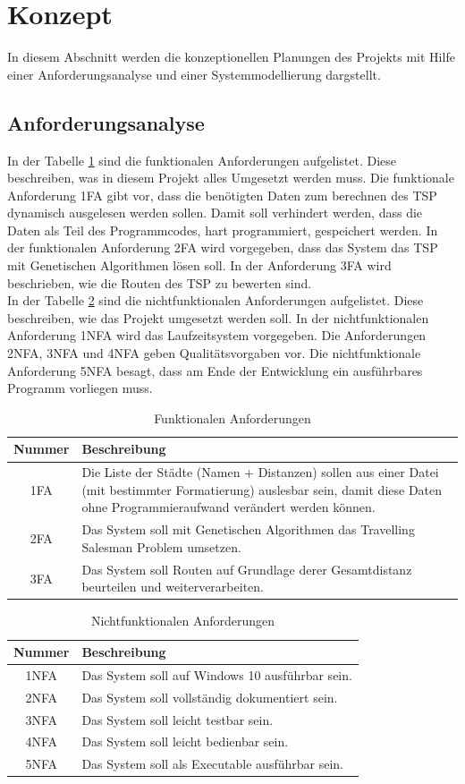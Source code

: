 \section{Konzept}
In diesem Abschnitt werden die konzeptionellen Planungen des Projekts mit Hilfe einer Anforderungsanalyse und einer Systemmodellierung dargstellt.

\subsection{Anforderungsanalyse}
In der Tabelle \ref{tab:fa} sind die funktionalen Anforderungen aufgelistet. Diese beschreiben, was in diesem Projekt alles Umgesetzt werden muss. Die funktionale Anforderung 1FA gibt vor, dass die benötigten Daten zum berechnen des TSP dynamisch ausgelesen werden sollen. Damit soll verhindert werden, dass die Daten als Teil des Programmcodes, hart programmiert, gespeichert werden.
In der funktionalen Anforderung 2FA wird vorgegeben, dass das System das TSP mit Genetischen Algorithmen lösen soll. In der Anforderung 3FA wird beschrieben, wie die Routen des TSP zu bewerten sind.\\
In der Tabelle \ref{tab:nfa} sind die nichtfunktionalen Anforderungen aufgelistet. Diese beschreiben, wie das Projekt umgesetzt werden soll. In der nichtfunktionalen Anforderung 1NFA wird das Laufzeitsystem vorgegeben. Die Anforderungen 2NFA, 3NFA und 4NFA geben Qualitätsvorgaben vor. Die nichtfunktionale Anforderung 5NFA besagt, dass am Ende der Entwicklung ein ausführbares Programm vorliegen muss.

\begin{table}[H]
\caption{Funktionalen Anforderungen}
\begin{tabular}{|c|p{12.5cm}|}
Nummer & Beschreibung \\
\hline
1FA & Die Liste der Städte (Namen + Distanzen) sollen aus einer Datei (mit bestimmter Formatierung) auslesbar sein, damit diese Daten ohne Programmieraufwand verändert werden können. \\  
2FA & Das System soll mit Genetischen Algorithmen das Travelling Salesman Problem umsetzen. \\  
3FA & Das System soll Routen auf Grundlage derer Gesamtdistanz beurteilen und weiterverarbeiten. \\  
\end{tabular}
\label{tab:fa}
\end{table}
\begin{table}[H]
\caption{Nichtfunktionalen Anforderungen}
\begin{tabular}{|c|p{12.5cm}|}
 Nummer & Beschreibung \\ 
\hline
1NFA & Das System soll auf Windows 10 ausführbar sein.\\
2NFA & Das System soll vollständig dokumentiert sein.\\
3NFA & Das System soll leicht testbar sein.\\
4NFA & Das System soll leicht bedienbar sein.\\
5NFA & Das System soll als Executable ausführbar sein.\\
\end{tabular}
\label{tab:nfa}
\end{table}


